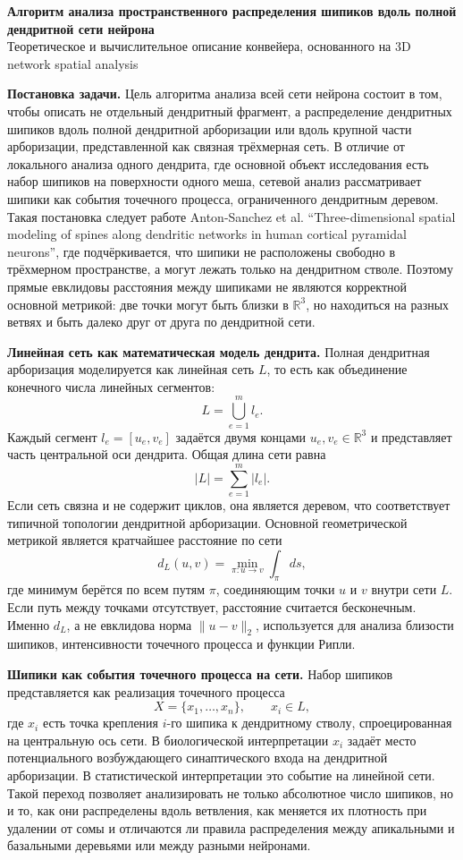 \documentclass[12pt,a4paper]{article}
\begin{document}
\begin{center}
{\Large\textbf{Алгоритм анализа пространственного распределения шипиков вдоль полной дендритной сети нейрона}}\\[0.5em]
{\normalsize Теоретическое и вычислительное описание конвейера, основанного на 3D network spatial analysis}
\end{center}

\noindent\textbf{Постановка задачи.}
Цель алгоритма анализа всей сети нейрона состоит в том, чтобы описать не отдельный дендритный фрагмент, а распределение дендритных шипиков вдоль полной дендритной арборизации или вдоль крупной части арборизации, представленной как связная трёхмерная сеть. В отличие от локального анализа одного дендрита, где основной объект исследования есть набор шипиков на поверхности одного меша, сетевой анализ рассматривает шипики как события точечного процесса, ограниченного дендритным деревом. Такая постановка следует работе Anton-Sanchez et al. ``Three-dimensional spatial modeling of spines along dendritic networks in human cortical pyramidal neurons'', где подчёркивается, что шипики не расположены свободно в трёхмерном пространстве, а могут лежать только на дендритном стволе. Поэтому прямые евклидовы расстояния между шипиками не являются корректной основной метрикой: две точки могут быть близки в \(\mathbb{R}^3\), но находиться на разных ветвях и быть далеко друг от друга по дендритной сети.

\noindent\textbf{Линейная сеть как математическая модель дендрита.}
Полная дендритная арборизация моделируется как линейная сеть \(L\), то есть как объединение конечного числа линейных сегментов:
\[
L=\bigcup_{e=1}^{m} l_e.
\]
Каждый сегмент \(l_e=[u_e,v_e]\) задаётся двумя концами \(u_e,v_e\in\mathbb{R}^3\) и представляет часть центральной оси дендрита. Общая длина сети равна
\[
|L|=\sum_{e=1}^{m}|l_e|.
\]
Если сеть связна и не содержит циклов, она является деревом, что соответствует типичной топологии дендритной арборизации. Основной геометрической метрикой является кратчайшее расстояние по сети
\[
d_L(u,v)=\min_{\pi:u\rightarrow v}\int_{\pi} ds,
\]
где минимум берётся по всем путям \(\pi\), соединяющим точки \(u\) и \(v\) внутри сети \(L\). Если путь между точками отсутствует, расстояние считается бесконечным. Именно \(d_L\), а не евклидова норма \(\|u-v\|_2\), используется для анализа близости шипиков, интенсивности точечного процесса и функции Рипли.

\noindent\textbf{Шипики как события точечного процесса на сети.}
Набор шипиков представляется как реализация точечного процесса
\[
X=\{x_1,\ldots,x_n\}, \qquad x_i\in L,
\]
где \(x_i\) есть точка крепления \(i\)-го шипика к дендритному стволу, спроецированная на центральную ось сети. В биологической интерпретации \(x_i\) задаёт место потенциального возбуждающего синаптического входа на дендритной арборизации. В статистической интерпретации это событие на линейной сети. Такой переход позволяет анализировать не только абсолютное число шипиков, но и то, как они распределены вдоль ветвления, как меняется их плотность при удалении от сомы и отличаются ли правила распределения между апикальными и базальными деревьями или между разными нейронами.
\end{document}
